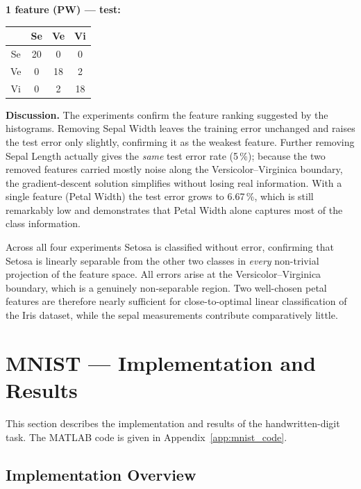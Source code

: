 \documentclass[11pt,a4paper]{article}
\begin{document}
\noindent\textbf{1 feature (PW) --- test:}
\begin{center}\begin{tabular}{c|ccc}\toprule
 & Se & Ve & Vi \\ \midrule
Se & 20 & 0 & 0 \\
Ve & 0 & 18 & 2 \\
Vi & 0 & 2 & 18 \\
\bottomrule\end{tabular}\end{center}

\bigskip
\textbf{Discussion.} The experiments confirm the feature ranking suggested by the histograms. Removing Sepal Width leaves the training error unchanged and raises the test error only slightly, confirming it as the weakest feature. Further removing Sepal Length actually gives the \emph{same} test error rate (5\,\%); because the two removed features carried mostly noise along the Versicolor--Virginica boundary, the gradient-descent solution simplifies without losing real information. With a single feature (Petal Width) the test error grows to 6.67\,\%, which is still remarkably low and demonstrates that Petal Width alone captures most of the class information.

Across all four experiments Setosa is classified without error, confirming that Setosa is linearly separable from the other two classes in \emph{every} non-trivial projection of the feature space. All errors arise at the Versicolor--Virginica boundary, which is a genuinely non-separable region. Two well-chosen petal features are therefore nearly sufficient for close-to-optimal linear classification of the Iris dataset, while the sepal measurements contribute comparatively little.

\section{MNIST --- Implementation and Results}
\label{sec:mnist_results}

This section describes the implementation and results of the handwritten-digit task. The MATLAB code is given in Appendix~\ref{app:mnist_code}.

\subsection{Implementation Overview}
\end{document}
